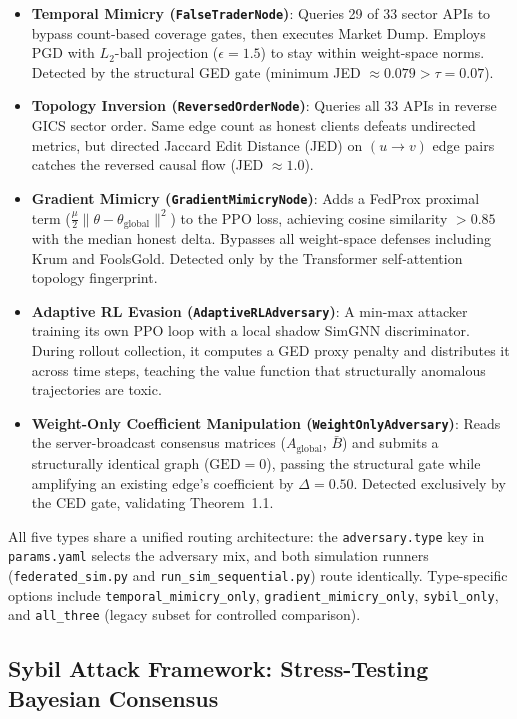 \documentclass[journal]{IEEEtran}
\begin{document}
\begin{itemize}
\item \textbf{Temporal Mimicry (\texttt{FalseTraderNode})}: Queries 29 of 33 sector APIs to bypass count-based coverage gates, then executes Market Dump. Employs PGD with $L_2$-ball projection ($\epsilon=1.5$) to stay within weight-space norms. Detected by the structural GED gate (minimum JED $\approx 0.079 > \tau = 0.07$).
\item \textbf{Topology Inversion (\texttt{ReversedOrderNode})}: Queries all 33 APIs in reverse GICS sector order. Same edge count as honest clients defeats undirected metrics, but directed Jaccard Edit Distance (JED) on $(u \to v)$ edge pairs catches the reversed causal flow (JED $\approx 1.0$).
\item \textbf{Gradient Mimicry (\texttt{GradientMimicryNode})}: Adds a FedProx proximal term ($\frac{\mu}{2} \| \theta - \theta_{\text{global}} \|^2$) to the PPO loss, achieving cosine similarity $>0.85$ with the median honest delta. Bypasses all weight-space defenses including Krum and FoolsGold. Detected only by the Transformer self-attention topology fingerprint.
\item \textbf{Adaptive RL Evasion (\texttt{AdaptiveRLAdversary})}: A min-max attacker training its own PPO loop with a local shadow SimGNN discriminator. During rollout collection, it computes a GED proxy penalty and distributes it across time steps, teaching the value function that structurally anomalous trajectories are toxic.
\item \textbf{Weight-Only Coefficient Manipulation (\texttt{WeightOnlyAdversary})}: Reads the server-broadcast consensus matrices ($A_{\text{global}}$, $\bar{B}$) and submits a structurally identical graph ($\text{GED}=0$), passing the structural gate while amplifying an existing edge's coefficient by $\Delta = 0.50$. Detected exclusively by the CED gate, validating Theorem~1.1.
\end{itemize}

All five types share a unified routing architecture: the \texttt{adversary.type} key in \texttt{params.yaml} selects the adversary mix, and both simulation runners (\texttt{federated\_sim.py} and \texttt{run\_sim\_sequential.py}) route identically. Type-specific options include \texttt{temporal\_mimicry\_only}, \texttt{gradient\_mimicry\_only}, \texttt{sybil\_only}, and \texttt{all\_three} (legacy subset for controlled comparison).

\subsection{Sybil Attack Framework: Stress-Testing Bayesian Consensus}
\end{document}
